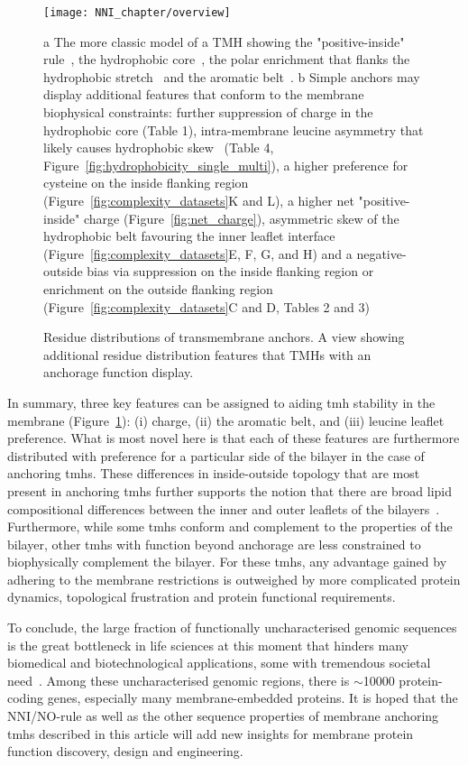 \begin{figure}[!ht]
\centering
\texttt{[image: NNI\_chapter/overview]}
\caption{Residue distributions of transmembrane anchors. A view showing additional residue distribution features that TMHs with an anchorage function display.}
\medskip
\justify
\small
a The more classic model of a TMH showing the "positive-inside" rule~\cite{VonHeijne1989}, the hydrophobic core~\cite{Kyte1982}, the polar enrichment that flanks the hydrophobic stretch~\cite{Baeza-Delgado2013} and the aromatic belt~\cite{Granseth2005}. b Simple anchors may display additional features that conform to the membrane biophysical constraints: further suppression of charge in the hydrophobic core (Table 1), intra-membrane leucine asymmetry that likely causes hydrophobic skew~\cite{Sharpe2010} (Table 4, Figure~\ref{fig:hydrophobicity_single_multi}), a higher preference for cysteine on the inside flanking region (Figure~\ref{fig:complexity_datasets}K and L), a higher net "positive-inside" charge (Figure~\ref{fig:net_charge}), asymmetric skew of the hydrophobic belt favouring the inner leaflet interface (Figure~\ref{fig:complexity_datasets}E, F, G, and H) and a negative-outside bias via suppression on the inside flanking region or enrichment on the outside flanking region (Figure~\ref{fig:complexity_datasets}C and D, Tables 2 and 3)
\label{fig:overview}
\end{figure}

In summary, three key features can be assigned to aiding \gls{tmh} stability in the membrane (Figure~\ref{fig:overview}): (i) charge, (ii) the aromatic belt, and (iii) leucine leaflet preference. What is most novel here is that each of these features are furthermore distributed with preference for a particular side of the bilayer in the case of anchoring \gls{tmh}s. These differences in inside-outside topology that are most present in anchoring \gls{tmh}s further supports the notion that there are broad lipid compositional differences between the inner and outer leaflets of the bilayers~\cite{Sharpe2010}. Furthermore, while some \gls{tmh}s conform and complement to the properties of the bilayer, other \gls{tmh}s with function beyond anchorage are less constrained to biophysically complement the bilayer. For these \gls{tmh}s, any advantage gained by adhering to the membrane restrictions is outweighed by more complicated protein dynamics, topological frustration and protein functional requirements.

To conclude, the large fraction of functionally uncharacterised genomic sequences is the great bottleneck in life sciences at this moment that hinders many biomedical and biotechnological applications, some with tremendous societal need~\cite{Eisenhaber2012,Kuznetsov2013}. Among these uncharacterised genomic regions, there is \(\sim\)10000 protein-coding genes, especially many membrane-embedded proteins. It is hoped that the NNI/NO-rule as well as the other sequence properties of membrane anchoring \gls{tmh}s described in this article will add new insights for membrane protein function discovery, design and engineering.


